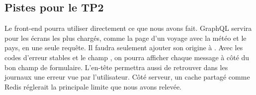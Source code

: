 \subsection{Pistes pour le TP2}

Le front-end pourra utiliser directement ce que nous avons fait. GraphQL servira pour les écrans les plus chargés, comme la page d'un voyage avec la météo et le pays, en une seule requête. Il faudra seulement ajouter son origine à . Avec les codes d'erreur stables et le champ , on pourra afficher chaque message à côté du bon champ de formulaire. L'en-tête  permettra aussi de retrouver dans les journaux une erreur vue par l'utilisateur. Côté serveur, un cache partagé comme Redis réglerait la principale limite que nous avons relevée.

